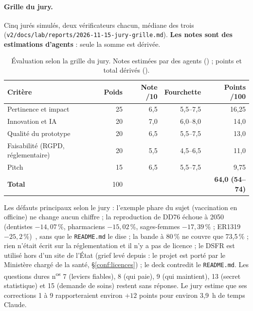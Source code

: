\paragraph{Grille du jury.}
Cinq jurés simulés, deux vérificateurs chacun, médiane des trois (\texttt{v2/\allowbreak{}docs/\allowbreak{}lab/\allowbreak{}reports/\allowbreak{}2026-\allowbreak{}11-\allowbreak{}15-\allowbreak{}jury-\allowbreak{}grille.md}).
\textbf{Les notes sont des estimations d'agents} : seule la somme est dérivée.

\begin{table}[htbp]\centering\small
\caption{Évaluation selon la grille du jury. Notes estimées par des agents (\suppose{}) ; points et total dérivés (\derive{}).}\label{pro:tab-jury}
\begin{tabular}{@{}lrrrr@{}}
\toprule Critère & Poids & Note /10 & Fourchette & Points /100 \\ \midrule
Pertinence et impact & 25 & 6,5\suppose{} & 5,5--7,5\suppose{} & 16,25\derive{} \\
Innovation et IA & 20 & 7,0\suppose{} & 6,0--8,0\suppose{} & 14,0\derive{} \\
Qualité du prototype & 20 & 6,5\suppose{} & 5,5--7,5\suppose{} & 13,0\derive{} \\
Faisabilité (RGPD, réglementaire) & 20 & 5,5\suppose{} & 4,5--6,5\suppose{} & 11,0\derive{} \\
Pitch & 15 & 6,5\suppose{} & 5,5--7,5\suppose{} & 9,75\derive{} \\ \midrule
\textbf{Total} & 100 & & & \textbf{64,0\derive{} (54--74\derive{})} \\ \bottomrule
\end{tabular}
\end{table}

Les défauts principaux selon le jury : l'exemple phare du sujet (vaccination en officine) ne change aucun chiffre ; la reproduction de DD76 échoue à 2050 (dentistes $-14{,}07$\mesure{}\,\%, pharmaciens $-15{,}02$\mesure{}\,\%, sages-femmes $-17{,}39$\mesure{}\,\% ; ER1319 $-25{,}2$\mesure{}\,\%)~\citep{e-dd76,e-er1319}, sans que le \texttt{README.md} le dise ; la bande à 80\,\% ne couvre que 73,5\mesure{}\,\% ; rien n'était écrit sur la réglementation et il n'y a pas de licence ; le DSFR est utilisé hors d'un site de l'État (grief levé depuis : le projet est porté par le Ministère chargé de la santé, §\ref{conf:licences}) ; le deck contredit le \texttt{README.md}.
Les questions dures n\textsuperscript{os} 7 (leviers fiables), 8 (qui paie), 9 (qui maintient), 13 (secret statistique) et 15 (demande de soins) restent sans réponse.
Le jury estime que ses corrections 1 à 9 rapporteraient environ $+12$\suppose{} points pour environ 3,9\suppose{}~h de temps Claude.

